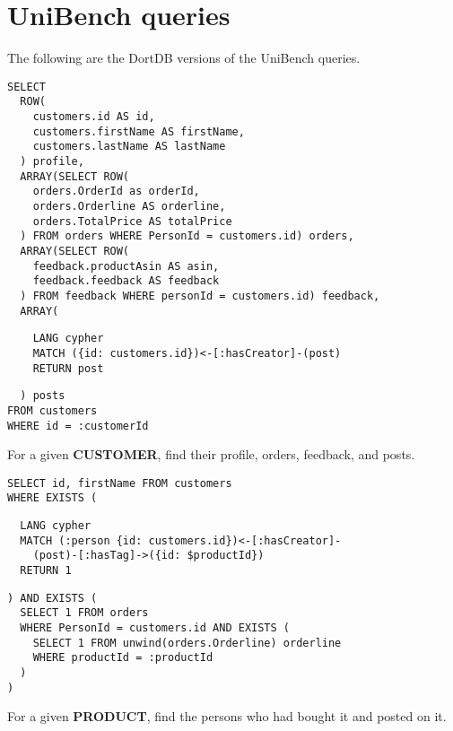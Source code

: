 \chapter{UniBench queries}
\label{apx:unibench-queries}
\setcounter{listing}{0}

The following are the DortDB versions of the UniBench\cite{zhang2018unibench} queries.

\begin{listing}[!ht]
\begin{verbatim}
SELECT
  ROW(
    customers.id AS id,
    customers.firstName AS firstName,
    customers.lastName AS lastName
  ) profile,
  ARRAY(SELECT ROW(
    orders.OrderId as orderId,
    orders.Orderline AS orderline,
    orders.TotalPrice AS totalPrice
  ) FROM orders WHERE PersonId = customers.id) orders,
  ARRAY(SELECT ROW(
    feedback.productAsin AS asin,
    feedback.feedback AS feedback
  ) FROM feedback WHERE personId = customers.id) feedback,
  ARRAY(
\end{verbatim}
\nestedMintedVspace
\begin{verbatim}
    LANG cypher
    MATCH ({id: customers.id})<-[:hasCreator]-(post)
    RETURN post
\end{verbatim}
\nestedMintedVspace
\begin{verbatim}
  ) posts
FROM customers
WHERE id = :customerId
\end{verbatim}
\caption{For a given \textbf{CUSTOMER}, find their profile,
orders, feedback, and posts.}
\end{listing}

\begin{listing}[!ht]
\begin{verbatim}
SELECT id, firstName FROM customers
WHERE EXISTS (
\end{verbatim}
\nestedMintedVspace
\begin{verbatim}
  LANG cypher
  MATCH (:person {id: customers.id})<-[:hasCreator]-
    (post)-[:hasTag]->({id: $productId})
  RETURN 1
\end{verbatim}
\nestedMintedVspace
\begin{verbatim}
) AND EXISTS (
  SELECT 1 FROM orders
  WHERE PersonId = customers.id AND EXISTS (
    SELECT 1 FROM unwind(orders.Orderline) orderline
    WHERE productId = :productId
  )
)
\end{verbatim}
\caption{For a given \textbf{PRODUCT}, find the persons who had bought it and posted on it.}
\end{listing}

